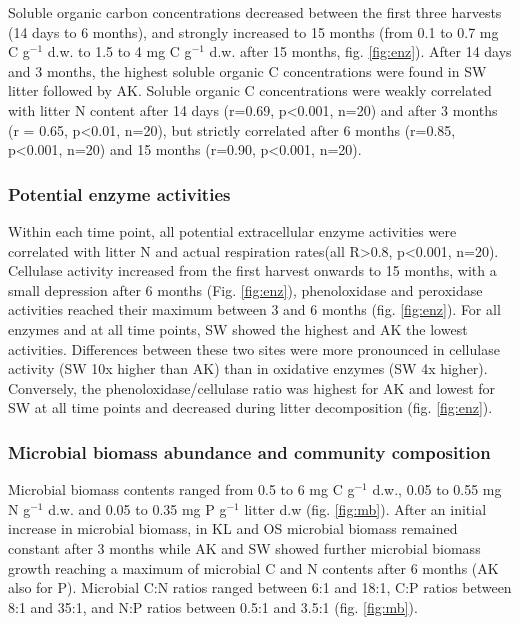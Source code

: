 Soluble organic carbon concentrations decreased between the first three harvests (14 days to 6 months), and strongly increased to 15 months (from 0.1 to 0.7 mg C g$^{-1}$  d.w. to 1.5 to 4 mg C g$^{-1}$ d.w. after 15 months, fig. \ref{fig:enz}). After 14 days and 3 months, the highest soluble organic C concentrations were found in SW litter followed by AK. Soluble organic C concentrations were weakly correlated with litter N content after 14 days (r=0.69, p\textless 0.001, n=20) and after 3 months (r = 0.65, p\textless 0.01, n=20), but strictly correlated after 6 months (r=0.85, p\textless 0.001, n=20) and 15 months (r=0.90, p\textless 0.001, n=20).

\subsubsection*{Potential enzyme activities}
Within each time point, all potential extracellular enzyme activities were correlated with litter N and actual respiration rates(all R\textgreater 0.8, p\textless 0.001, n=20). Cellulase activity increased from the first harvest onwards to 15 months, with a small depression after 6 months (Fig. \ref{fig:enz}), phenoloxidase and peroxidase activities reached their maximum between 3 and 6 months (fig. \ref{fig:enz}). For all enzymes and at all time points, SW showed the highest and AK the lowest activities. Differences between these two sites were more pronounced in cellulase activity (SW 10x higher than AK) than in oxidative enzymes (SW 4x higher). Conversely, the phenoloxidase/cellulase ratio was highest for AK and lowest for SW at all time points and decreased during litter decomposition (fig. \ref{fig:enz}).

\subsubsection*{Microbial biomass abundance and community composition}
Microbial biomass contents ranged from 0.5 to 6 mg C g$^{-1}$ d.w., 0.05 to 0.55 mg N g$^{-1}$ d.w. and 0.05 to 0.35 mg P g$^{-1}$ litter d.w (fig. \ref{fig:mb}). After an initial increase in microbial biomass, in KL and OS microbial biomass remained constant after 3 months while AK and SW showed further microbial biomass growth reaching a maximum of microbial C and N contents after 6 months (AK also for P). Microbial C:N ratios ranged between 6:1 and 18:1, C:P ratios between 8:1 and 35:1, and N:P ratios between 0.5:1 and 3.5:1 (fig. \ref{fig:mb}).


